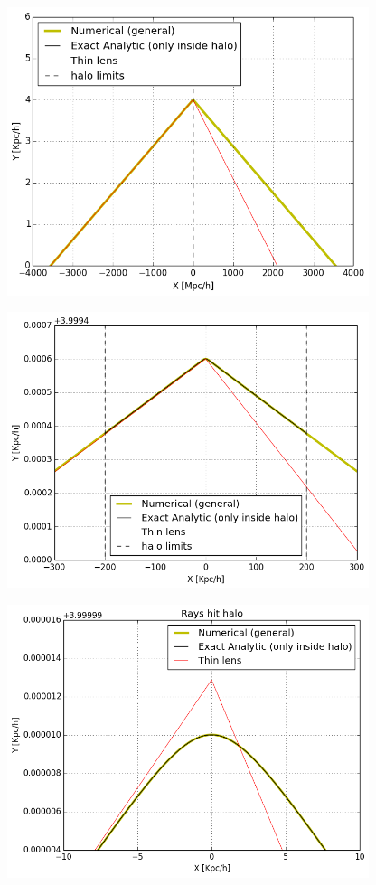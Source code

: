 \documentclass{article}
\begin{document}
\includegraphics[width=300pt]{zoom_1.png}

\includegraphics[width=300pt]{zoom_2.png}

\includegraphics[width=300pt]{zoom_3.png}
\end{document}
